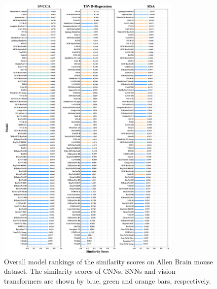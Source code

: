 \documentclass[letterpaper]{article} %
\begin{document}
\begin{figure}[t]
	\centering
	\includegraphics[width=0.80\textwidth]{figs/model_rank_allen_natural_scenes_color.pdf}
	\caption{Overall model rankings of the similarity scores on Allen Brain mouse dataset. The similarity scores of CNNs, SNNs and vision transformers are shown by blue, green and orange bars, respectively.}
	\label{Fig.model_rank_allen_brain}
\end{figure}
\end{document}
